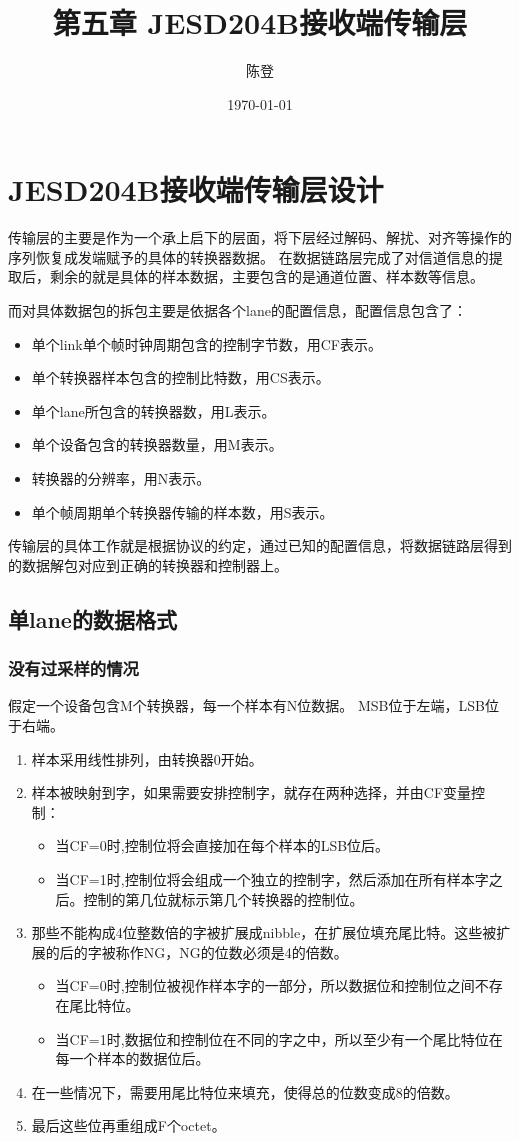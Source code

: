 \documentclass[UTF8]{ctexart}
\title{第五章 JESD204B接收端传输层}
\author{陈登}
\date{\today}
\begin{document}
\section{JESD204B接收端传输层设计}

传输层的主要是作为一个承上启下的层面，将下层经过解码、解扰、对齐等操作的序列恢复成发端赋予的具体的转换器数据。
在数据链路层完成了对信道信息的提取后，剩余的就是具体的样本数据，主要包含的是通道位置、样本数等信息。

而对具体数据包的拆包主要是依据各个lane的配置信息，配置信息包含了：
\begin{itemize}
  \item 单个link单个帧时钟周期包含的控制字节数，用CF表示。
  \item 单个转换器样本包含的控制比特数，用CS表示。
  \item 单个lane所包含的转换器数，用L表示。
  \item 单个设备包含的转换器数量，用M表示。
  \item 转换器的分辨率，用N表示。
  \item 单个帧周期单个转换器传输的样本数，用S表示。
\end{itemize}

传输层的具体工作就是根据协议的约定，通过已知的配置信息，将数据链路层得到的数据解包对应到正确的转换器和控制器上。

\subsection{单lane的数据格式}

\subsubsection{没有过采样的情况}

假定一个设备包含M个转换器，每一个样本有N位数据。
MSB位于左端，LSB位于右端。

\begin{enumerate}
	\item 样本采用线性排列，由转换器0开始。
	\item 样本被映射到字，如果需要安排控制字，就存在两种选择，并由CF变量控制：
	\begin{itemize}
		\item 当CF=0时,控制位将会直接加在每个样本的LSB位后。
		\item 当CF=1时,控制位将会组成一个独立的控制字，然后添加在所有样本字之后。控制的第几位就标示第几个转换器的控制位。
	\end{itemize}
	\item 那些不能构成4位整数倍的字被扩展成nibble，在扩展位填充尾比特。这些被扩展的后的字被称作NG，NG的位数必须是4的倍数。
	\begin{itemize}
		\item 当CF=0时,控制位被视作样本字的一部分，所以数据位和控制位之间不存在尾比特位。
		\item 当CF=1时,数据位和控制位在不同的字之中，所以至少有一个尾比特位在每一个样本的数据位后。
	\end{itemize}
	\item 在一些情况下，需要用尾比特位来填充，使得总的位数变成8的倍数。
	\item 最后这些位再重组成F个octet。
\end{enumerate}
\end{document}
